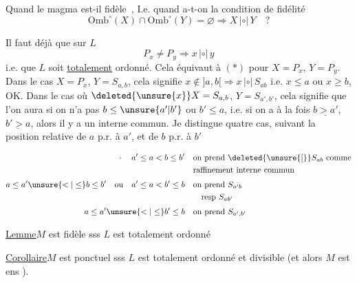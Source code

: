 Quand le magma est-il fidèle \,, I.e. quand a-t-on la condition de fidélité
\begingroup
\makeatletter\tagsleft@true\makeatother
\[
 \mathrm{Omb}^{\circ}(X)\cap\mathrm{Omb}^{\circ}(Y)=\varnothing
 \Longrightarrow X\,|\circ|\,Y\quad ? \tag*{(*)}
\]
\endgroup

Il faut déjà que sur $L$
\[
 P_x\ne P_y\Longrightarrow x\,|\circ|\,y
\]
i.e. que $L$ soit \uline{totalement} ordonné. Cela équivaut à $(*)$ pour $X=P_x$, $Y=P_y$. Dans le cas $X=P_x$, $Y=S_{a,b}$, cela signifie $x\notin ]a,b[\Longrightarrow x\,|\circ|\,S_{ab}$ i.e. $x\leq a$ ou $x\geq b$, OK. Dans le cas où $\deleted{\unsure{x}}X=S_{a,b}$, $Y=S_{a',b'}$, cela signifie que l'on aura  si on  n'a pas $b\leq\unsure{a'|b'}$ ou $b'\leq a$, i.e. si on a à la fois $\underline{b>a'}$, $\underline{b'>a}$, alors il y a un  interne commun. Je distingue quatre cas, suivant la position relative de $a$ p.r. à $a'$, et de $b$ p.r. à $b'$

\[
\begin{aligned}
 {}\cdot\quad a'\leq a<b\leq b'&\quad\text{on prend }\deleted{\unsure{[}}S_{ab}\ \text{comme}\\
 &\quad\text{raffinement interne commun}\\[3pt]
 a\leq a'\unsure{<|\leq}b\leq b'\quad\text{ou}\quad a'\leq a<b'\leq b
 &\quad\text{on prend }S_{a'b}\\
 &\qquad\text{resp }S_{ab'}\\[3pt]
 a\leq a'\unsure{<|\leq}b'\leq b&\quad\text{on prend }S_{a',b'}
\end{aligned}
\]

 \uline{Lemme}\qquad $M$ est fidèle sss $L$ est totalement ordonné

\uline{Corollaire}\qquad $M$ est ponctuel sss $L$ est totalement ordonné et divisible (et alors $M$ est  ens ).

